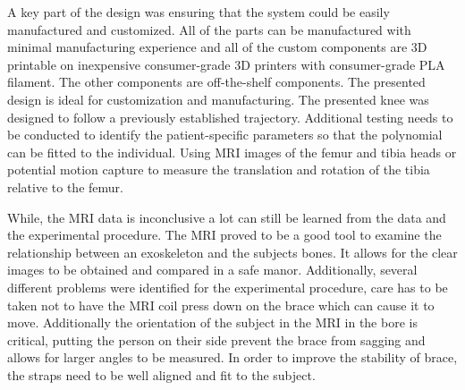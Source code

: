 A key part of the design was ensuring that the system could be easily manufactured and customized. All of the parts can be manufactured with minimal manufacturing experience and all of the custom components are 3D printable on inexpensive consumer-grade 3D printers with consumer-grade PLA filament. The other components are off-the-shelf components. The presented design is ideal for customization and manufacturing. The presented knee was designed to follow a previously established trajectory. Additional testing needs to be conducted to identify the patient-specific parameters so that the polynomial can be fitted to the individual. Using MRI images of the femur and tibia heads or potential motion capture to measure the translation and rotation of the tibia relative to the femur. 

While, the MRI data is inconclusive a lot can still be learned from the data and the experimental procedure. The MRI proved to be a good tool to examine the relationship between an exoskeleton and the subjects bones. It allows for the clear images to be obtained and compared in a safe manor. Additionally, several different problems were identified for the experimental procedure, care has to be taken not to have the MRI coil press down on the brace which can cause it to move. Additionally the orientation of the subject in the MRI in the bore is critical, putting the person on their side prevent the brace from sagging and allows for larger angles to be measured. In order to improve the stability of brace, the straps need to be well aligned and fit to the subject. 


